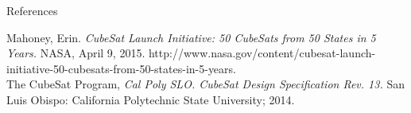 \documentclass[slidestop,compress]{beamer}
\begin{document}
\begin{frame}[plain]
\begin{block}{\centering References}
\begin{thebibliography}{9}
Mahoney, Erin. {\it CubeSat Launch Initiative: 50 CubeSats from 50 States in 5 Years.} NASA, April 9, 2015. http://www.nasa.gov/content/cubesat-launch-initiative-50-cubesats-from-50-states-in-5-years.\\

The CubeSat Program, {\it Cal Poly SLO. CubeSat Design Specification Rev. 13.} San Luis
Obispo: California Polytechnic State University; 2014.
\end{thebibliography}
\end{block}    
\end{frame}
\end{document}
